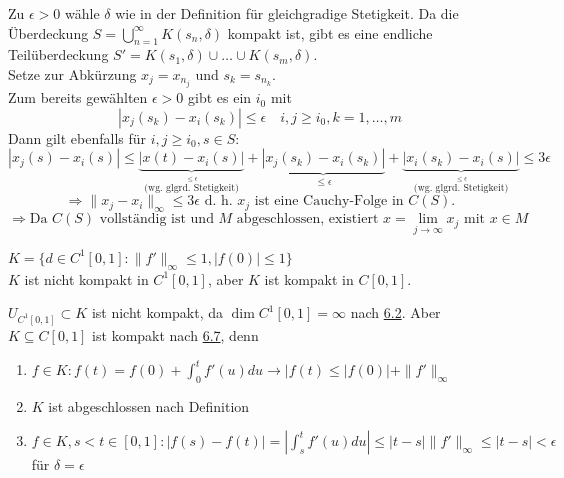 \begin{beweis}
	Zu $\epsilon > 0$ wähle $\delta$ wie in der Definition für gleichgradige Stetigkeit.
	Da die Überdeckung $S = \bigcup_{n = 1}^{\infty} K(s_{n}, \delta)$ kompakt ist, gibt es eine endliche Teilüberdeckung $S' = K(s_1, \delta) \cup \dotsc \cup K(s_{m}, \delta)$. \\
	Setze zur Abkürzung $x_{j} = x_{n_{j}}$ und $s_{k} = s_{n_{k}}$. \\
	Zum bereits gewählten $\epsilon > 0$ gibt es ein $i_{0}$ mit 
	\[ | x_{j}(s_{k}) - x_{i}(s_{k}) | \leq \epsilon \quad i, j \geq i_{0}, k = 1, \dotsc, m \]
	Dann gilt ebenfalls für $i, j \geq i_{0}, s \in S$: \\
	\[ | x_{j}(s) - x_{i}(s) | \leq \underbrace{| x(t) - x_{i}(s) |}_{\overset{\leq \epsilon}{\text{(wg. glgrd. Stetigkeit)}}} + \underbrace{| x_{j}(s_{k}) - x_{i}(s_{k}) |}_{\leq \epsilon} + \underbrace{| x_{i}(s_{k}) - x_{i}(s) |}_{\overset{\leq \epsilon}{\text{(wg. glgrd. Stetigkeit)}}} \leq 3 \epsilon \]
	\[ \Rightarrow \| x_{j} - x_{i}\|_{\infty} \leq 3 \epsilon \text{ d. h. } x_{j} \text{ ist eine Cauchy-Folge in } C(S). \]
	\[ \Rightarrow \text{Da } C(S) \text{ vollständig ist und } M \text{ abgeschlossen, existiert } x = \lim_{j \rightarrow \infty} x_{j} \text{ mit } x \in M \]
\end{beweis}


\begin{beispiel}
	$K = \{ d \in C^{1}[0, 1]: \| f' \|_{\infty} \leq 1, | f(0) | \leq 1 \}$ \\
	$K$ ist nicht kompakt in $C^{1}[0, 1]$, aber $K$ ist kompakt in $C[0, 1]$.	
\end{beispiel}

\begin{beweis}
	$U_{C^{1}[0, 1]} \subset K$ ist nicht kompakt, da $\dim C^{1}[0, 1] = \infty$ nach \hyperref[satz:6.2]{6.2}. Aber $K \subseteq C[0, 1]$ ist kompakt nach \hyperref[satz:6.7-ArzelaAscoli]{6.7}, denn 
	\begin{enumerate}[label=\alph*\upshape)]
		\item $f \in K: f(t) = f(0) + \int_{0}^{t} f'(u) du \rightarrow |f(t) \leq |f(0)| + \| f' \|_{\infty}$
		\item $K$ ist abgeschlossen nach Definition
		\item $f \in K, s < t \in [0, 1]: |f(s) - f(t)| = | \int_{s}^{t} f'(u) du | \leq |t-s| \|f'\|_{\infty} \leq | t - s| < \epsilon$ für $\delta = \epsilon$
	\end{enumerate}
\end{beweis}


